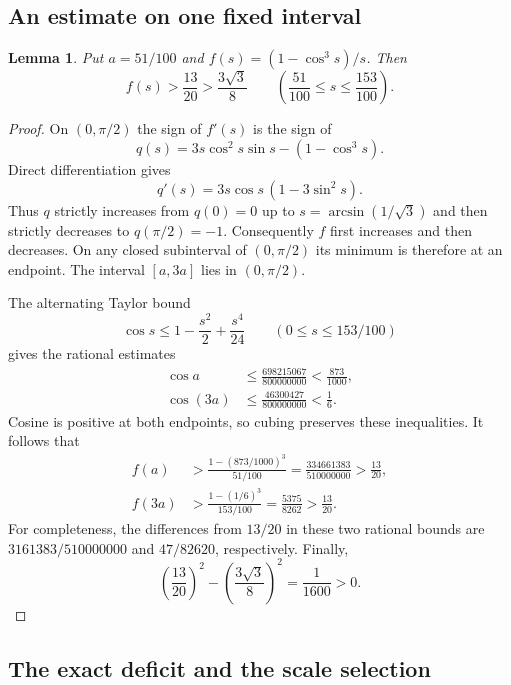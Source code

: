 \documentclass[11pt,a4paper]{article}
\numberwithin{equation}{section}
\newtheorem{lemma}[theorem]{Lemma}
\theoremstyle{remark}
\begin{document}
\subsection{An estimate on one fixed interval}

\begin{lemma}\label{lem:one-scale}
Put $a=51/100$ and $f(s)=(1-\cos^3s)/s$. Then
\[
 f(s)>\frac{13}{20}>\frac{3\sqrt3}{8}
 \qquad\left(\frac{51}{100}\le s\le\frac{153}{100}\right).
\]
\end{lemma}

\begin{proof}
On $(0,\pi/2)$ the sign of $f'(s)$ is the sign of
\[
 q(s)=3s\cos^2s\sin s-(1-\cos^3s).
\]
Direct differentiation gives
\[
 q'(s)=3s\cos s\,(1-3\sin^2s).
\]
Thus $q$ strictly increases from $q(0)=0$ up to
$s=\arcsin(1/\sqrt3)$ and then strictly decreases to
$q(\pi/2)=-1$. Consequently $f$ first increases and then decreases.
On any closed subinterval of $(0,\pi/2)$ its minimum is therefore
at an endpoint. The interval $[a,3a]$ lies in $(0,\pi/2)$.

The alternating Taylor bound
\[
 \cos s\le 1-\frac{s^2}{2}+\frac{s^4}{24}
 \qquad(0\le s\le 153/100)
\]
gives the rational estimates
\begin{align*}
 \cos a&\le\frac{698215067}{800000000}<\frac{873}{1000},\\
 \cos(3a)&\le\frac{46300427}{800000000}<\frac16.
\end{align*}
Cosine is positive at both endpoints, so cubing preserves these
inequalities. It follows that
\begin{align*}
 f(a)&>\frac{1-(873/1000)^3}{51/100}
      =\frac{334661383}{510000000}>\frac{13}{20},\\
 f(3a)&>\frac{1-(1/6)^3}{153/100}
      =\frac{5375}{8262}>\frac{13}{20}.
\end{align*}
For completeness, the differences from $13/20$ in these two rational
bounds are $3161383/510000000$ and $47/82620$, respectively.
Finally,
\[
 \left(\frac{13}{20}\right)^2-
 \left(\frac{3\sqrt3}{8}\right)^2=\frac1{1600}>0.
\]
\end{proof}

\subsection{The exact deficit and the scale selection}
\end{document}
